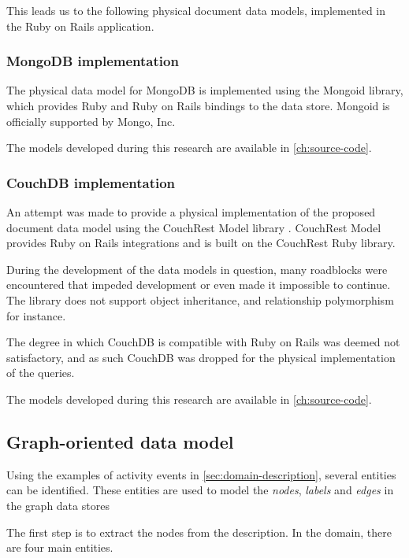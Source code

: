 This leads us to the following physical document data models, implemented in the Ruby on Rails application.

\subsubsection{MongoDB implementation}
\label{subsubsec:mongodb-implementation}

The physical data model for MongoDB is implemented using the Mongoid library, which provides Ruby and Ruby on Rails bindings to the data store.
Mongoid is officially supported by Mongo, Inc.

The models developed during this research are available in \cref{ch:source-code}.

\subsubsection{CouchDB implementation}
\label{subsubsec:couchdb-implementation}

An attempt was made to provide a physical implementation of the proposed document data model using the CouchRest Model library \autocite{Couchrest2011}.
CouchRest Model provides Ruby on Rails integrations and is built on the CouchRest Ruby library.

During the development of the data models in question, many roadblocks were encountered that impeded development or even made it impossible to continue.
The library does not support object inheritance, and relationship polymorphism for instance.

The degree in which CouchDB is compatible with Ruby on Rails was deemed not satisfactory, and as such CouchDB was dropped for the physical implementation of the queries.

The models developed during this research are available in \cref{ch:source-code}.

\subsection{Graph-oriented data model}
\label{subsec:graph-data-model}

Using the examples of activity events in \cref{sec:domain-description}, several entities can be identified.
These entities are used to model the \textit{nodes}, \textit{labels} and \textit{edges} in the graph data stores

The first step is to extract the nodes from the description.
In the domain, there are four main entities.


